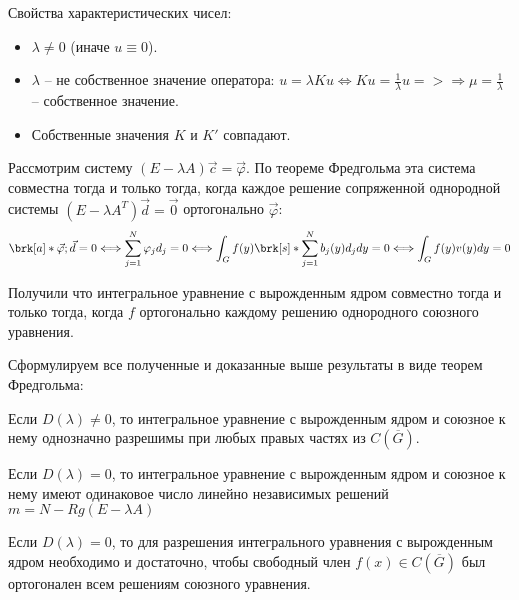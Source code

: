 Свойства характеристических чисел:
\begin{itemize}
  \item $\lambda \neq 0$ (иначе $u \equiv 0$).
  \item $\lambda$ -- не собственное значение оператора: $u = \lambda K u \Leftrightarrow Ku = \frac{1}{\lambda}u => \Rightarrow \mu = \frac{1}{\lambda}$ -- собственное значение.
  \item Собственные значения $K$ и $K'$ совпадают.
\end{itemize}

Рассмотрим систему $(E - \lambda A)\vec{c} = \vec{\varphi}$.
По теореме Фредгольма эта система совместна тогда и только тогда, когда каждое решение сопряженной однородной системы $(E - \lambda A^{T})\vec{d} = \vec{0}$ ортогонально $\vec{\varphi}$:
$$\brk[a]*{\vec{\varphi}; \vec{d}} = 0 \Longleftrightarrow \sum_{j=1}^{N}\varphi_{j}d_{j} = 0 \Longleftrightarrow \int_{G}f(y)\brk[s]*{\sum_{j = 1}^{N}b_{j}(y)d_{j}}dy = 0 \Longleftrightarrow \int_{G}f(y)v(y)dy = 0$$

Получили что интегральное уравнение с вырожденным ядром совместно тогда и только тогда, когда $f$ ортогонально каждому решению однородного союзного уравнения.

Сформулируем все полученные и доказанные выше результаты в виде теорем Фредгольма:

\begin{theorem}
  Если $D(\lambda) \neq 0$, то интегральное уравнение с вырожденным ядром и союзное к нему однозначно разрешимы при любых правых частях из $C(\overline{G})$.
\end{theorem}
\begin{theorem}
   Если $D(\lambda) = 0$, то интегральное уравнение с вырожденным ядром и союзное к нему имеют одинаковое число линейно независимых решений $m = N - Rg(E - \lambda A)$
\end{theorem}
\begin{theorem}
  Если $D(\lambda) = 0$, то для разрешения интегрального уравнения с вырожденным ядром необходимо и достаточно, чтобы свободный член $f(x) \in C(\overline{G})$ был ортогонален всем решениям союзного уравнения.
\end{theorem}